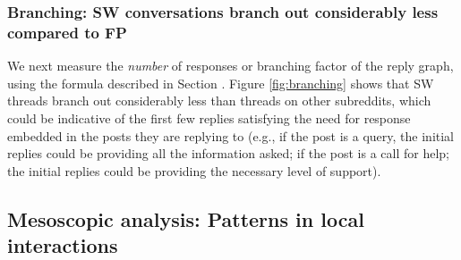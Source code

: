 \subsubsection{Branching: SW conversations branch out considerably less compared to FP}
We next measure the \textit{number} of responses or branching factor of the reply graph, using the formula described in Section . Figure \ref{fig:branching} shows that SW threads branch out considerably less than threads on other subreddits, which could be indicative of the first few replies satisfying the need for response embedded in the posts they are replying to (e.g., if the  post is a query, the initial replies could be providing all the information asked; if the post is a call for help; the initial replies could be providing the necessary level of support). %



\subsection{Mesoscopic analysis: Patterns in local interactions}




